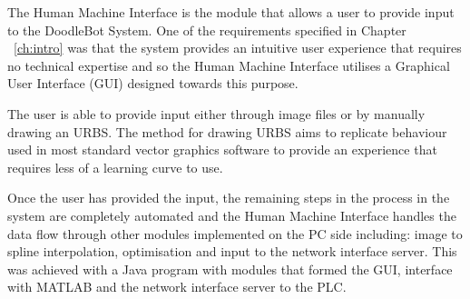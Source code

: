 The Human Machine Interface is the module that allows a user to provide input to the DoodleBot System. One of the requirements specified in Chapter ~\ref{ch:intro} was that the system provides an intuitive user experience that requires no technical expertise and so the Human Machine Interface utilises a Graphical User Interface (GUI) designed towards this purpose.

The user is able to provide input either through image files or by manually drawing an URBS. The method for drawing URBS aims to replicate behaviour used in most standard vector graphics software to provide an experience that requires less of a learning curve to use.

Once the user has provided the input, the remaining steps in the process in the system are completely automated and the Human Machine Interface handles the data flow through other modules implemented on the PC side including: image to spline interpolation, optimisation and input to the network interface server. This was achieved with a Java program with modules that formed the GUI, interface with MATLAB\textsuperscript{\textregistered} and the network interface server to the PLC.